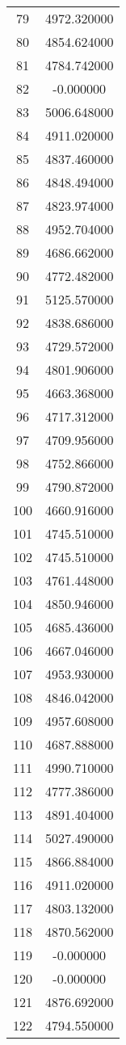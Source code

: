 \documentclass[12pt]{article}
\begin{document}
\begin{longtable}{@{}cc@{}}
79 & 4972.320000 \\
80 & 4854.624000 \\
81 & 4784.742000 \\
82 & -0.000000 \\
83 & 5006.648000 \\
84 & 4911.020000 \\
85 & 4837.460000 \\
86 & 4848.494000 \\
87 & 4823.974000 \\
88 & 4952.704000 \\
89 & 4686.662000 \\
90 & 4772.482000 \\
91 & 5125.570000 \\
92 & 4838.686000 \\
93 & 4729.572000 \\
94 & 4801.906000 \\
95 & 4663.368000 \\
96 & 4717.312000 \\
97 & 4709.956000 \\
98 & 4752.866000 \\
99 & 4790.872000 \\
100 & 4660.916000 \\
101 & 4745.510000 \\
102 & 4745.510000 \\
103 & 4761.448000 \\
104 & 4850.946000 \\
105 & 4685.436000 \\
106 & 4667.046000 \\
107 & 4953.930000 \\
108 & 4846.042000 \\
109 & 4957.608000 \\
110 & 4687.888000 \\
111 & 4990.710000 \\
112 & 4777.386000 \\
113 & 4891.404000 \\
114 & 5027.490000 \\
115 & 4866.884000 \\
116 & 4911.020000 \\
117 & 4803.132000 \\
118 & 4870.562000 \\
119 & -0.000000 \\
120 & -0.000000 \\
121 & 4876.692000 \\
122 & 4794.550000 \\

\end{longtable}
\end{document}
